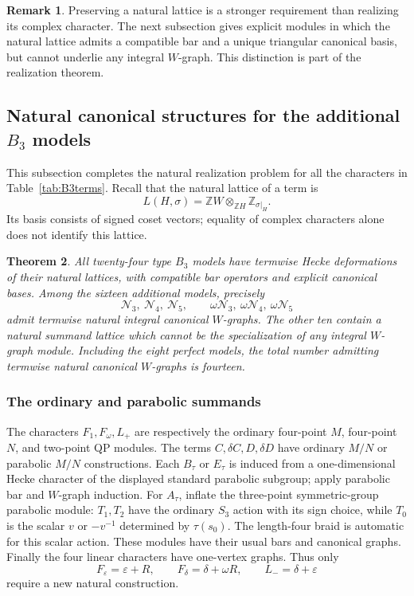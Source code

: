 \documentclass[11pt]{article}
\numberwithin{equation}{section}
\newtheorem{theorem}{Theorem}[section]
\theoremstyle{definition}
\newtheorem{remark}[theorem]{Remark}
\newcommand{\Z}{\mathbb Z}
\newcommand{\ee}{\varepsilon}
\newcommand{\dd}{\delta}
\newcommand{\om}{\omega}
\begin{document}
\begin{remark}
Preserving a natural lattice is a stronger requirement than realizing its complex character.
The next subsection gives explicit modules in which the natural lattice admits a compatible bar and a unique triangular canonical basis, but cannot underlie any integral \(W\)-graph.
This distinction is part of the realization theorem.
\end{remark}

\subsection{Natural canonical structures for the additional \texorpdfstring{\(B_3\)}{B3} models}
\label{sec:B3canonical}

This subsection completes the natural realization problem for all the characters in Table~\ref{tab:B3terms}.
Recall that the natural lattice of a term is
\[
 L(H,\sigma)=\Z W\otimes_{\Z H}\Z_{\sigma|_H}.
\]
Its basis consists of signed coset vectors; equality of complex characters alone does not identify this lattice.

\begin{theorem}\label{thm:B3natural}
All twenty-four type \(B_3\) models have termwise Hecke deformations of their natural lattices, with compatible bar operators and explicit canonical bases.
Among the sixteen additional models, precisely
\[
 \mathscr N_3,\ \mathscr N_4,\ \mathscr N_5,\qquad
 \om\mathscr N_3,\ \om\mathscr N_4,\ \om\mathscr N_5
\]
admit termwise natural integral canonical \(W\)-graphs.
The other ten contain a natural summand lattice which cannot be the specialization of any integral \(W\)-graph module.
Including the eight perfect models, the total number admitting termwise natural canonical \(W\)-graphs is fourteen.
\end{theorem}

\subsubsection{The ordinary and parabolic summands}

The characters \(F_1,F_\om,L_+\) are respectively the ordinary four-point \(M\), four-point \(N\), and two-point QP modules.
The terms \(C,\dd C,D,\dd D\) have ordinary \(M/N\) or parabolic \(M/N\) constructions.
Each \(B_\tau\) or \(E_\tau\) is induced from a one-dimensional Hecke character of the displayed standard parabolic subgroup; apply parabolic bar and \(W\)-graph induction.
For \(A_\tau\), inflate the three-point symmetric-group parabolic module: \(T_1,T_2\) have the ordinary \(S_3\) action with its sign choice, while \(T_0\) is the scalar \(v\) or \(-v^{-1}\) determined by \(\tau(s_0)\).
The length-four braid is automatic for this scalar action.
These modules have their usual bars and canonical graphs.
Finally the four linear characters have one-vertex graphs.
Thus only
\[
 F_\ee=\ee+R,\qquad F_\dd=\dd+\om R,\qquad L_-=\dd+\ee
\]
require a new natural construction.
\end{document}
